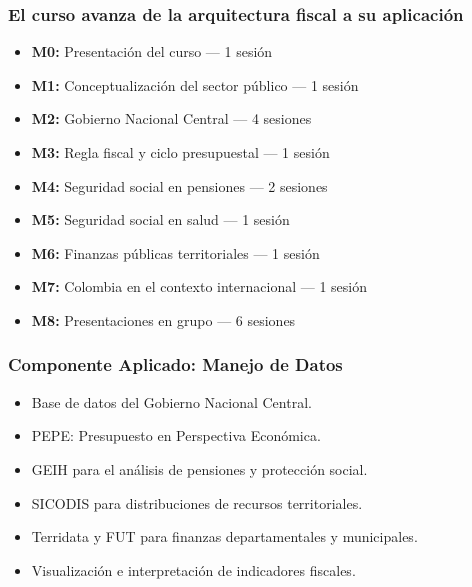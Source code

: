 \begin{frame}
  \frametitle{El curso avanza de la arquitectura fiscal a su aplicaci\'on}
  \small
  \begin{itemize}
    \item \textbf{M0:} Presentaci\'on del curso --- 1 sesi\'on
    \item \textbf{M1:} Conceptualizaci\'on del sector p\'ublico --- 1 sesi\'on
    \item \textbf{M2:} Gobierno Nacional Central --- 4 sesiones
    \item \textbf{M3:} Regla fiscal y ciclo presupuestal --- 1 sesi\'on
    \item \textbf{M4:} Seguridad social en pensiones --- 2 sesiones
    \item \textbf{M5:} Seguridad social en salud --- 1 sesi\'on
    \item \textbf{M6:} Finanzas p\'ublicas territoriales --- 1 sesi\'on
    \item \textbf{M7:} Colombia en el contexto internacional --- 1 sesi\'on
    \item \textbf{M8:} Presentaciones en grupo --- 6 sesiones
  \end{itemize}
\end{frame}

\begin{frame}
  \frametitle{Componente Aplicado: Manejo de Datos}
  \begin{itemize}
    \item Base de datos del Gobierno Nacional Central.
    \item PEPE: Presupuesto en Perspectiva Econ\'omica.
    \item GEIH para el an\'alisis de pensiones y protecci\'on social.
    \item SICODIS para distribuciones de recursos territoriales.
    \item Terridata y FUT para finanzas departamentales y municipales.
    \item Visualizaci\'on e interpretaci\'on de indicadores fiscales.
  \end{itemize}
\end{frame}

